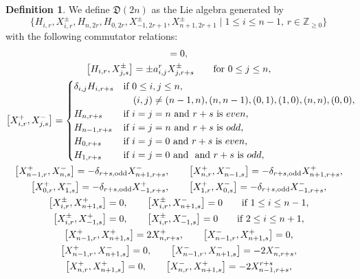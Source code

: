 \documentclass[pdftex]{sigma}
\numberwithin{equation}{section}
\theoremstyle{definition}
\newtheorem{Definition}[Theorem]{Definition}
\begin{document}
\begin{Definition}
We define $\mathfrak{D}(2n)$ as the Lie algebra generated by
\begin{equation*}
\bigl\{H_{i,r},X^\pm_{i,r},H_{n,2r},H_{0,2r},X^\pm_{-1,2r+1},X^\pm_{n+1,2r+1} \mid 1\leq i\leq n-1,\, r\in\mathbb{Z}_{\geq0}\bigr\}
\end{equation*}
with the following commutator relations:
\begin{gather}
[H_{i,r},H_{j,s}]=0, \label{5111}\\
\bigl[H_{i,r},X^\pm_{j,s}\bigr]=\pm a^r_{i,j}X^\pm_{j,r+s}\qquad \text{for }0\leq j\leq n,\label{5112}\\
\bigl[X^+_{i,r},X^-_{j,s}\bigr]=\begin{cases}
\delta_{i,j}H_{i,r+s}& \text{if} \ 0\leq i,j\leq n,\\
& \hphantom{\text{for}}\! (i,j)\neq(n-1,n),(n,n-1),(0,1),(1,0),(n,n),(0,0),\\
H_{n,r+s}& \text{if }i=j=n\text{ and }r+s\text{ is }even,\\
H_{n-1,r+s}& \text{if }i=j=n\text{ and }r+s\text{ is }odd,\\
H_{0,r+s}& \text{if }i=j=0\text{ and }r+s\text{ is }even,\\
H_{1,r+s}& \text{if }i=j=0\text{ and }\text{ and }r+s\text{ is }odd,
\end{cases}\!\!\! \label{5113}\\
\bigl[X^+_{n-1,r},X^-_{n,s}\bigr]=-\delta_{r+s,{\rm odd}}X^-_{n+1,r+s},\qquad \bigl[X^+_{n,r},X^-_{n-1,s}\bigr]=-\delta_{r+s,{\rm odd}}X^+_{n+1,r+s},\label{5114}\\
\bigl[X^+_{0,r},X^-_{1,s}\bigr]=-\delta_{r+s,{\rm odd}}X^+_{-1,r+s},\qquad \bigl[X^+_{1,r},X^-_{0,s}\bigr]=-\delta_{r+s,{\rm odd}}X^-_{-1,r+s}, \label{5115}\\
\bigl[X^\pm_{i,r},X^+_{n+1,s}\bigr]=0,\qquad\bigl[X^\pm_{i,r},X^-_{n+1,s}\bigr]=0 \qquad\text{if }1\leq i\leq n-1, \label{5116}\\
\bigl[X^\pm_{i,r},X^+_{-1,s}\bigr]=0,\qquad\bigl[X^\pm_{i,r},X^-_{-1,s}\bigr]=0 \qquad\text{if }2\leq i\leq n+1,\label{5117}\\
\bigl[X^+_{n-1,r},X^+_{n+1,s}\bigr]=2X^+_{n,r+s},\qquad \bigl[X^-_{n-1,r},X^+_{n+1,s}\bigr]=0,\label{5118}\\
\bigl[X^+_{n-1,r},X^-_{n+1,s}\bigr]=0,\qquad \bigl[X^-_{n-1,r},X^-_{n+1,s}\bigr]=-2X^-_{n,r+s},\label{5119}\\
\bigl[X^+_{n,r},X^+_{n+1,s}\bigr]=0,\qquad \bigl[X^-_{n,r},X^+_{n+1,s}\bigr]=-2X^{r+s}_{n-1,r+s}, \label{5120}\\

\end{gather}
\end{Definition}
\end{document}
